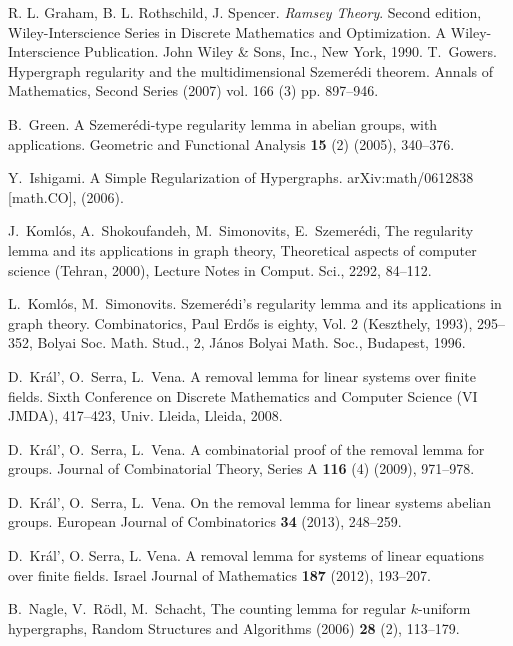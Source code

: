 \documentclass[10pt]{article}
\begin{document}
\begin{thebibliography}{99}
	
	 R. L. Graham, B. L. Rothschild, J. Spencer. \emph{Ramsey Theory}. Second edition,  Wiley-Interscience Series in Discrete Mathematics and Optimization. A Wiley-Interscience Publication. John Wiley \& Sons, Inc., New York, 1990.
	 T.~Gowers. Hypergraph regularity and the multidimensional Szemer\'edi theorem. Annals of Mathematics, Second Series (2007) vol. 166 (3) pp. 897--946.
	
	 B.~Green. A Szemer\'edi-type regularity lemma in abelian groups, with applications. Geometric and Functional Analysis \textbf{15} (2) (2005), 340--376.
	
	Y.~Ishigami. A Simple Regularization of Hypergraphs. arXiv:math/0612838 [math.CO], (2006).
	
J.~Koml{\'o}s, A.~Shokoufandeh, M.~Simonovits, E.~Szemer{\'e}di, The regularity lemma and its applications in graph theory, Theoretical aspects of computer science ({T}ehran, 2000), Lecture Notes in Comput. Sci., 2292, 84--112.
	

	L.~Koml\'os, M.~Simonovits.
	Szemer\'edi's regularity lemma and its applications in graph theory. Combinatorics, Paul Erd\H{o}s is eighty, Vol. 2 (Keszthely, 1993), 295--352, 
	Bolyai Soc. Math. Stud., 2, J\'anos Bolyai Math. Soc., Budapest, 1996.
	
	
D.~Kr\'al', O.~Serra, L.~Vena.
A removal lemma for linear systems over finite fields. Sixth Conference on Discrete Mathematics and Computer Science (VI JMDA), 417--423, Univ. Lleida, Lleida, 2008.

 D.~Kr\'al', O.~Serra, L.~Vena. A combinatorial proof of the removal lemma for groups. Journal of Combinatorial Theory, Series A \textbf{116} (4) (2009), 971--978.

D.~Kr\'al', O.~Serra, L.~Vena. On the removal lemma for linear systems abelian groups. European Journal of Combinatorics \textbf{34} (2013), 248--259.

 D.~Kr\'al', O. Serra, L. Vena. A removal lemma for systems of linear equations over finite fields. Israel Journal of Mathematics \textbf{187} (2012), 193--207.

B.~Nagle, V.~R{{\"o}}dl, M.~Schacht, The counting lemma for regular {$k$}-uniform hypergraphs, Random Structures and Algorithms (2006) \textbf{28} (2), 113--179.



\end{thebibliography}
\end{document}
